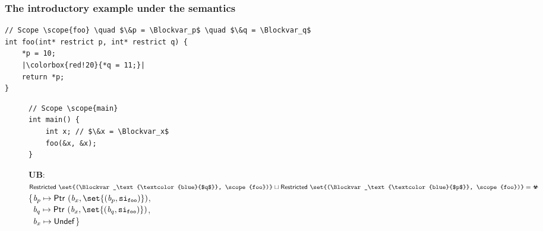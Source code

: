 
\begin{frame}[fragile]
\frametitle{The introductory example under the \cinkrestrict semantics}
\begin{verbatim}
// Scope \scope{foo} \quad $\&p = \Blockvar_p$ \quad $\&q = \Blockvar_q$
int foo(int* restrict p, int* restrict q) {   
    *p = 10;
    |\colorbox{red!20}{*q = 11;}|
    return *p;
}
\end{verbatim}
\vspace*{-30pt}
\begin{figure}[h]
\centering
\begin{minipage}{.33\textwidth}
\begin{verbatim}
// Scope \scope{main}
int main() {
    int x; // $\&x = \Blockvar_x$
    foo(&x, &x);
}
\end{verbatim}
\end{minipage}%
\begin{minipage}{.67\textwidth}
\textbf{UB}: \colorbox{red!20}{$\restricted{\set{(\Blockvar_\text{\textcolor{blue}{$q$}}, \scope{foo})}} \joinsym \restricted{\set{(\Blockvar_\text{\textcolor{blue}{$p$}}, \scope{foo})}} = \rsub$}
\\

\executionannotation
{\{$\Blockvar_p \mapsto \ptr{(\Blockvar_x, \set{(\Blockvar_p, \scope{foo})})}$,\\
                                            \ $\Blockvar_q \mapsto \ptr{(\Blockvar_x, \set{(\Blockvar_q, \scope{foo})})}$, \\
                                            \ $\textit{b}_x \mapsto \mathsf{Undef}$\}
}
{
}
\end{minipage}
\end{figure}

\end{frame}
